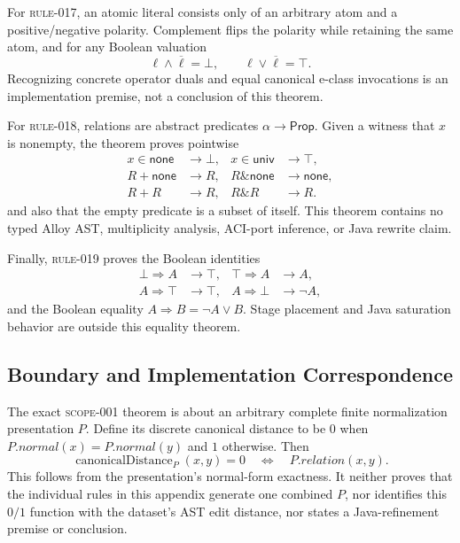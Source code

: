 For \textsc{rule-017}, an atomic literal consists only of an arbitrary atom and
a positive/negative polarity.  Complement flips the polarity while retaining
the same atom, and for any Boolean valuation
\[
  \ell\land\overline\ell=\bot,
  \qquad
  \ell\lor\overline\ell=\top.
\]
Recognizing concrete operator duals and equal canonical e-class invocations is
an implementation premise, not a conclusion of this theorem.

For \textsc{rule-018}, relations are abstract predicates
$\alpha\to\mathsf{Prop}$.  Given a witness that $x$ is nonempty, the theorem
proves pointwise
\begin{align*}
 x\in\mathsf{none}&\longrightarrow\bot,&
 x\in\mathsf{univ}&\longrightarrow\top,\\
 R+\mathsf{none}&\longrightarrow R,&
 R\mathbin{\&}\mathsf{none}&\longrightarrow\mathsf{none},\\
 R+R&\longrightarrow R,&
 R\mathbin{\&}R&\longrightarrow R.
\end{align*}
and also that the empty predicate is a subset of itself.  This theorem contains
no typed Alloy AST, multiplicity analysis, ACI-port inference, or Java rewrite
claim.

Finally, \textsc{rule-019} proves the Boolean identities
\begin{align*}
 \bot\Rightarrow A&\longrightarrow\top,&
 \top\Rightarrow A&\longrightarrow A,\\
 A\Rightarrow\top&\longrightarrow\top,&
 A\Rightarrow\bot&\longrightarrow\neg A,
\end{align*}
and the Boolean equality $A\Rightarrow B=\neg A\lor B$.  Stage placement and
Java saturation behavior are outside this equality theorem.

\subsection{Boundary and Implementation Correspondence}

The exact \textsc{scope-001} theorem is about an arbitrary complete finite
normalization presentation $P$.  Define its discrete canonical distance to be
$0$ when $P.\mathit{normal}(x)=P.\mathit{normal}(y)$ and $1$ otherwise.  Then
\[
  \operatorname{canonicalDistance}_P(x,y)=0
  \quad\Longleftrightarrow\quad P.\mathit{relation}(x,y).
\]
This follows from the presentation's normal-form exactness.  It neither proves
that the individual rules in this appendix generate one combined $P$, nor
identifies this $0/1$ function with the dataset's AST edit distance, nor states
a Java-refinement premise or conclusion.

